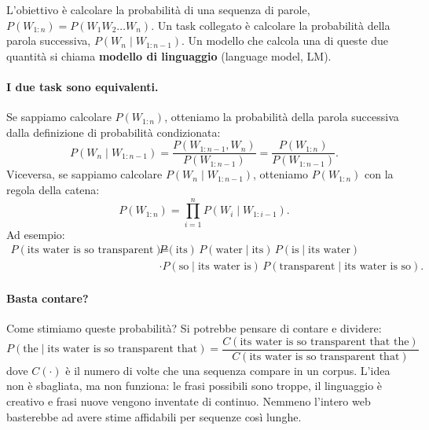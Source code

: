 L'obiettivo è calcolare la probabilità di una sequenza di parole, $P(W_{1:n}) = P(W_1 W_2 \dots W_n)$. Un task collegato è calcolare la probabilità della parola successiva, $P(W_n \mid W_{1:n-1})$. Un modello che calcola una di queste due quantità si chiama \textbf{modello di linguaggio} (language model, LM).

\paragraph{I due task sono equivalenti.} Se sappiamo calcolare $P(W_{1:n})$, otteniamo la probabilità della parola successiva dalla definizione di probabilità condizionata:
\[
P(W_n \mid W_{1:n-1}) = \frac{P(W_{1:n-1}, W_n)}{P(W_{1:n-1})} = \frac{P(W_{1:n})}{P(W_{1:n-1})}.
\]
Viceversa, se sappiamo calcolare $P(W_n \mid W_{1:n-1})$, otteniamo $P(W_{1:n})$ con la regola della catena:
\begin{equation}\label{eq:chain-words}
P(W_{1:n}) = \prod_{i=1}^{n} P(W_i \mid W_{1:i-1}).
\end{equation}
Ad esempio:
\begin{align*}
P(\text{its water is so transparent}) = {} & P(\text{its})\, P(\text{water} \mid \text{its})\, P(\text{is} \mid \text{its water}) \\
& \cdot P(\text{so} \mid \text{its water is})\, P(\text{transparent} \mid \text{its water is so}).
\end{align*}

\paragraph{Basta contare?} Come stimiamo queste probabilità? Si potrebbe pensare di contare e dividere:
\[
P(\text{the} \mid \text{its water is so transparent that}) = \frac{C(\text{its water is so transparent that the})}{C(\text{its water is so transparent that})}
\]
dove $C(\cdot)$ è il numero di volte che una sequenza compare in un corpus. L'idea non è sbagliata, ma non funziona: le frasi possibili sono troppe, il linguaggio è creativo e frasi nuove vengono inventate di continuo. Nemmeno l'intero web basterebbe ad avere stime affidabili per sequenze così lunghe.

